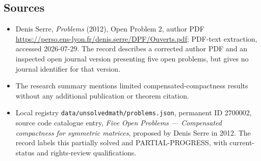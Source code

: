 \documentclass[11pt]{article}
\begin{document}
\subsection{Sources}
\begin{itemize}
\item Denis Serre, \emph{Problems} (2012), Open Problem 2, author PDF \url{https://perso.ens-lyon.fr/denis.serre/DPF/Ouverts.pdf}; PDF-text extraction, accessed 2026-07-29. The record describes a corrected author PDF and an inspected open journal version presenting five open problems, but gives no journal identifier for that version.
\item The research summary mentions limited compensated-compactness results without any additional publication or theorem citation.
\item Local registry \texttt{data/unsolvedmath/problems.json}, permanent ID $2700002$, source code catalogue entry, \emph{Five Open Problems --- Compensated compactness for symmetric matrices}, proposed by Denis Serre in 2012. The record labels this partially solved and PARTIAL-PROGRESS, with current-status and rights-review qualifications.
\end{itemize}
\end{document}

